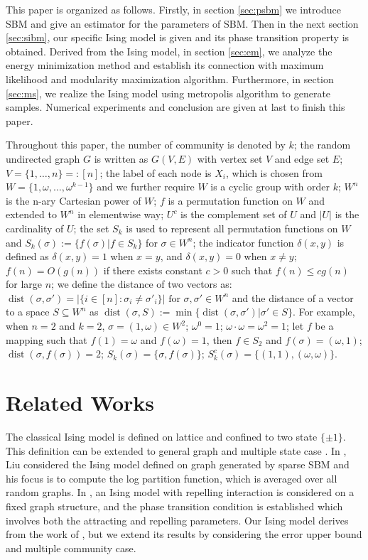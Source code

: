 \documentclass[entropy,article,submit,moreauthors,pdftex]{Definitions/mdpi}
\newcommand{\1}{\mathbbm{1}}
\DeclareMathOperator{\Dist}{dist}
\begin{document}
This paper is organized as follows. Firstly, in section \ref{sec:psbm} we introduce SBM and give an estimator for the parameters of SBM.
Then in the next section \ref{sec:sibm}, our specific Ising model is given and its phase transition property is obtained.
Derived from the Ising model, in section \ref{sec:em}, we analyze the energy minimization method and establish its connection with maximum likelihood and modularity
maximization algorithm. Furthermore, in section \ref{sec:ms},
we realize the Ising model using metropolis algorithm to generate samples. Numerical experiments and conclusion are given at last to finish this paper.

Throughout this paper, the number of community is denoted by $k$;
the random undirected graph $G$ is written as $G(V,E)$ with vertex set $V$ and edge set $E$;
$V=\{1,\dots, n\} =: [n]$;
the label of each node is $X_i$, which is chosen from $W= \{1, \omega, \dots, \omega^{k-1}\}$ and we further require $W$
is a cyclic group with order $k$;
$W^n$ is the n-ary Cartesian power of $W$;
$f$ is a permutation function on $W$ and extended to $W^n$ in elementwise way;
$U^c$ is the complement set of $U$ and $|U|$ is the cardinality of $U$;  
the set $S_k$ is used to represent all permutation functions on $W$ and $S_k(\sigma):=\{f(\sigma)| f\in S_k\}$ for $\sigma \in W^n$;
the indicator function $\delta(x,y)$ is defined as
$\delta(x,y) = 1 $ when $x=y$, and $\delta(x,y)=0$ when $x\neq y$;
$f(n) = O(g(n))$ if there exists constant $c > 0$ such that $ f(n) \leq c g(n)$
for large $n$;
we define the distance of two vectors as:
$\Dist(\sigma, \sigma')
=|\{i\in[n]:\sigma_i\neq \sigma'_i\}| \textrm{ for } \sigma,\sigma'\in W^n
$ and the distance of a vector to a space $S\subseteq W^n$
as
$\Dist(\sigma,S)
:=\min\{\Dist(\sigma, \sigma') | \sigma' \in S\}
$. For example, when $n=2$ and $k=2$, $\sigma=(1, \omega) \in W^2$;
$\omega^0 = 1$; $\omega \cdot \omega = \omega^2 = 1$; let $f$ be a mapping such that $f(1) = \omega$ and $f(\omega)=1$,
then $f \in S_2$ and $f(\sigma) = (\omega, 1)$; $\Dist(\sigma, f(\sigma)) = 2$; $S_k(\sigma) = \{\sigma, f(\sigma)\}$;
$S_k^c(\sigma) = \{(1, 1), (\omega, \omega)\}$.
\section{Related Works}
The classical Ising model is defined on lattice and confined to two state $\{\pm 1\}$. This definition
can be extended to general graph and multiple state case \cite{potts1952some}. In \cite{liu2017log}, Liu considered
the Ising model defined on graph generated by sparse SBM and his focus is to compute the log partition function,
which is averaged over all random graphs. In \cite{berthet2019exact}, an Ising model with repelling interaction
is considered on a fixed graph structure, and the phase transition condition is established which involves both the attracting and repelling
parameters. Our Ising model derives from the work of \cite{ye2020exact}, but we extend its results by considering the error upper bound and
multiple community case.
\end{document}
